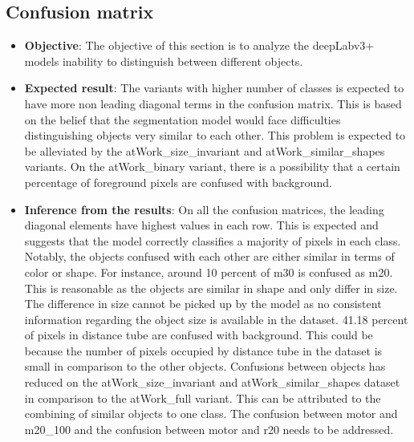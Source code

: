 	\subsection{Confusion matrix}
		\begin{itemize}
			\item \textbf{Objective}: The objective of this section is to analyze the deepLabv3+ models inability to distinguish between different objects. 
			\item \textbf{Expected result}: The variants with higher number of classes is expected to have more non leading diagonal terms in the confusion matrix. This is based on the belief that the segmentation model would face difficulties distinguishing objects very similar to each other. This problem is expected to be alleviated by the atWork\_size\_invariant and atWork\_similar\_shapes variants. On the atWork\_binary variant, there is a possibility that a certain percentage of foreground pixels are confused with background.
			\item \textbf{Inference from the results}: On all the confusion matrices, the leading diagonal elements have highest values in each row. This is expected and suggests that the model correctly classifies a majority of pixels in each class. Notably, the objects confused with each other are either similar in terms of color or shape. For instance, around 10 percent of m30 is confused as m20. This is reasonable as the objects are similar in shape and only differ in size. The difference in size cannot be picked up by the model as no consistent information regarding the object size is available in the dataset. 41.18 percent of pixels in distance tube are confused with background. This could be because the number of pixels occupied by distance tube in the dataset is small in comparison to the other objects.
			Confusions between objects has reduced on the atWork\_size\_invariant and atWork\_similar\_shapes dataset in comparison to the atWork\_full variant. This can be attributed to the combining of similar objects to one class. The confusion between motor and m20\_100 and the confusion between motor and r20 needs to be addressed.
		\end{itemize}

